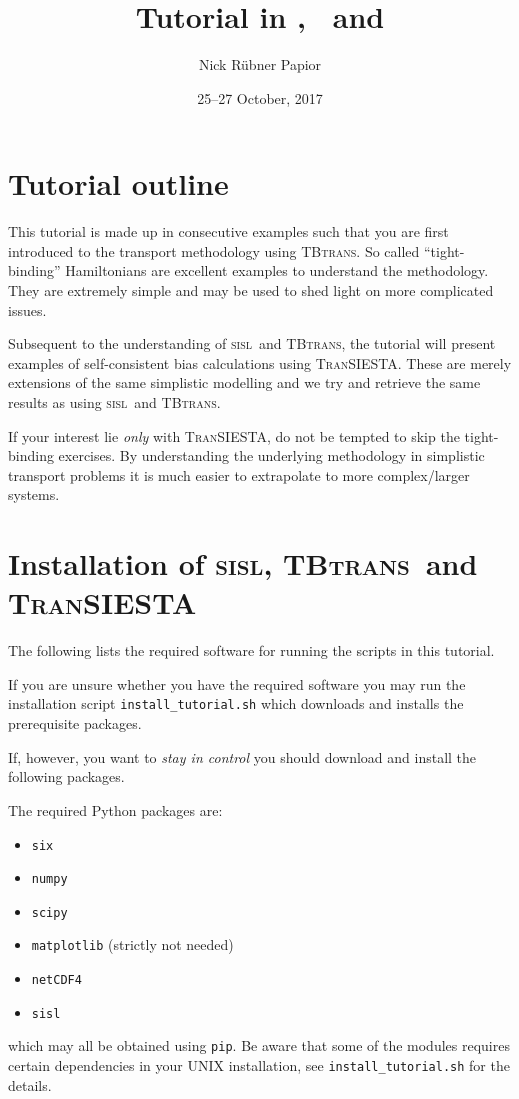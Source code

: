 \documentclass[10pt]{article}
\title{Tutorial in \sisl, \tbt\ and \ts}
\author{Nick R\"ubner Papior}
\date{25--27 October, 2017}
\newcommand\sisl{\textsc{sisl}}
\newcommand\tbt{\textsc{TBtrans}}
\newcommand\ts{\textsc{TranSIESTA}}
\newcommand\script[1]{\texttt{#1}}
\newcounter{example}
\begin{document}
\maketitle

\tableofcontents


\section{Tutorial outline}

This tutorial is made up in consecutive examples such that you are first introduced to the
transport methodology using \tbt. So called ``tight-binding'' Hamiltonians are excellent
examples to understand the methodology. They are extremely simple and may be used to shed
light on more complicated issues.

Subsequent to the understanding of \sisl\ and \tbt, the tutorial will present examples of
self-consistent bias calculations using \ts. These are merely extensions of the same
simplistic modelling and we try and retrieve the same results as using \sisl\ and \tbt.

If your interest lie \emph{only} with \ts, do not be tempted to skip the tight-binding
exercises. By understanding the underlying methodology in simplistic transport problems it
is much easier to extrapolate to more complex/larger systems.



\section{Installation of \sisl, \tbt\ and \ts}

The following lists the required software for running the scripts in this tutorial.

If you are unsure whether you have the required software you may run the installation
script \script{install\_tutorial.sh} which downloads and installs the prerequisite
packages. 

If, however, you want to \emph{stay in control} you should download and install
the following packages.

The required Python packages are:
\begin{itemize}
  \itemsep=0pt
  \parskip=0pt
  \item \script{six}
  \item \script{numpy}
  \item \script{scipy}
  \item \script{matplotlib} (strictly not needed)
  \item \script{netCDF4}
  \item \script{sisl}
\end{itemize}
which may all be obtained using \script{pip}. Be aware that some of the modules requires
certain dependencies in your UNIX installation, see \script{install\_tutorial.sh} for the
details.
\end{document}
